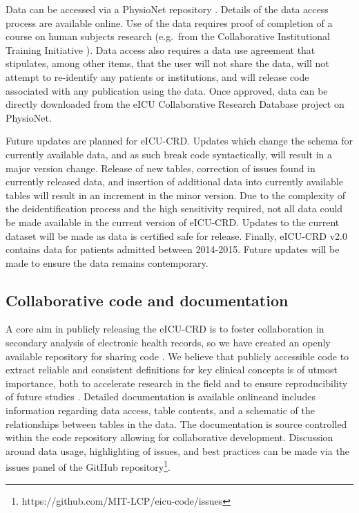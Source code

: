 \documentclass[english]{article}
\begin{document}
Data can be accessed via a PhysioNet repository \cite{physionet-ref}.
Details of the data access process are available online\footnotemark[1].
Use of the data requires proof of completion of a course on human subjects research (e.g.~from the Collaborative Institutional Training Initiative \cite{citicourse}).
Data access also requires a data use agreement that stipulates, among other items, that the user will not share the data, will not attempt to re-identify any patients or institutions, and will release code associated with any publication using the data. Once approved, data can be directly downloaded from the eICU Collaborative Research Database project on PhysioNet.

Future updates are planned for eICU-CRD. Updates which change the schema for currently available data, and as such break code syntactically, will result in a major version change. Release of new tables, correction of issues found in currently released data, and insertion of additional data into currently available tables will result in an increment in the minor version.
Due to the complexity of the deidentification process and the high sensitivity required, not all data could be made available in the current version of eICU-CRD.
Updates to the current dataset will be made as data is certified safe for release.
Finally, eICU-CRD v2.0 contains data for patients admitted between 2014-2015. Future updates will be made to ensure the data remains contemporary.

\subsection*{Collaborative code and documentation}\label{collaborative-code-and-documentation}

A core aim in publicly releasing the eICU-CRD is to foster collaboration in secondary analysis of electronic health records, so we have created an openly available repository for sharing code \cite{eicu-code}. We believe that publicly accessible code to extract reliable and consistent definitions for key clinical concepts is of utmost importance, both to accelerate research in the field and to ensure reproducibility of future studies \cite{johnson2017reproducibility}.
Detailed documentation is available online\footnotemark[1] and includes information regarding data access, table contents, and a schematic of the relationships between tables in the data.
The documentation is source controlled within the code repository allowing for collaborative development\cite{eicu-code}. Discussion around data usage, highlighting of issues, and best practices can be made via the issues panel of the GitHub repository\footnote{https://github.com/MIT-LCP/eicu-code/issues}.
\end{document}

